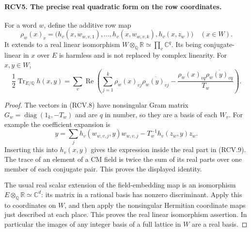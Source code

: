 \paragraph{RCV5. The precise real quadratic form on the row coordinates.}
\label{claim:RCV5}
For a word \(w\), define the additive row map
\[
 \rho_w(x)_v=
 \big(h_v(x,w_{w,v,1}),\ldots,h_v(x,w_{w,v,k}),h_v(x,z_w)\big)
       \quad(x\in W).
\tag{RCV.8}
\]
It extends to a real linear isomorphism
\(W\otimes_{\mathbb Q}\mathbb R\simeq\prod_v\mathbb C^q\).
Its being conjugate-linear in \(x\) over \(E\) is harmless and
is not replaced by complex linearity.  For \(x,y\in W\),
\[
 \frac12\operatorname{Tr}_{E/\mathbb Q}h(x,y)
 =\sum_v\operatorname{Re}\left(
    \sum_{j=1}^k \rho_w(x)_{vj}\overline{\rho_w(y)_{vj}}
       -\frac{\rho_w(x)_{vq}\overline{\rho_w(y)_{vq}}}{T_w}\right).
\tag{RCV.9}
\]
\begin{proof}
The vectors in (RCV.8) have nonsingular Gram matrix
\(G_w=\operatorname{diag}(1_k,-T_w)\) and are \(q\) in number,
so they are a basis of each \(W_v\).  For example the coefficient
expansion is
\[
 y=\sum_j h_v(w_{w,v,j},y)w_{w,v,j}
                         -T_w^{-1}h_v(z_w,y)z_w.
\]
Inserting this into \(h_v(x,y)\) gives the expression inside the
real part in (RCV.9).  The trace of an element of a CM field is
twice the sum of its real parts over one member of each conjugate
pair.  This proves the displayed identity.

The usual real scalar extension of the field-embedding map is an
isomorphism \(E\otimes_{\mathbb Q}\mathbb R\simeq\mathbb C^d\):
its matrix in a rational basis has nonzero discriminant.  Apply this
to coordinates on \(W\), and then apply the nonsingular Hermitian
coordinate maps just described at each place.  This proves the real
linear isomorphism assertion.  In particular the images of any
integer basis of a full lattice in \(W\) are a real basis.
\end{proof}

